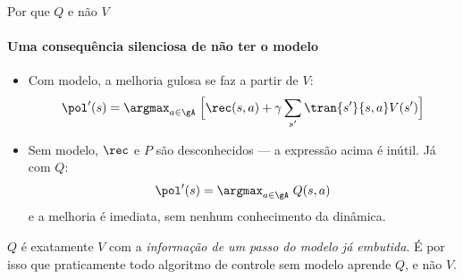 \documentclass[aspectratio=169, 11pt]{beamer}
\begin{document}
\begin{frame}{Por que $Q$ e não $V$}
  \framesubtitle{Uma consequência silenciosa de não ter o modelo}

  \begin{itemize}\setlength{\itemsep}{0.4ex}
    \item Com modelo, a melhoria gulosa se faz a partir de $V$:
      \[ \pol'(s) = \argmax_{a \in \gA}\; \Bigl[\rec(s,a) + \gamma \sum_{s'} \tran{s'}{s,a} V(s')\Bigr] \]
    \item Sem modelo, $\rec$ e $P$ são desconhecidos --- a expressão acima é
      inútil. Já com $Q$:
      \[ \pol'(s) = \argmax_{a \in \gA}\; Q(s,a) \]
      e a melhoria é imediata, sem nenhum conhecimento da dinâmica.
  \end{itemize}

  \begin{ideiabox}
    $Q$ é exatamente $V$ com a \emph{informação de um passo do modelo já
    embutida}. É por isso que praticamente todo algoritmo de controle sem
    modelo aprende $Q$, e não $V$.
  \end{ideiabox}

\end{frame}
\end{document}

